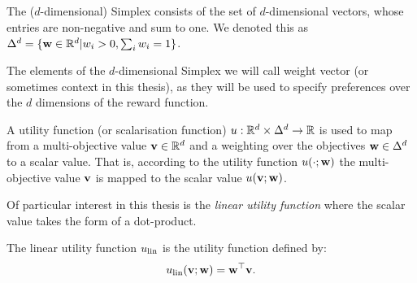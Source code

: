     \begin{defn}
        \label{def:simplex}
        \label{def:weight}
        \label{def:context}
        The \textnormal{($d$-dimensional) Simplex} consists of the set of $d$-dimensional vectors, whose entries are non-negative and sum to one. We denoted this as $\Delta^d = \{\mathbf{w}\in\mathbb{R}^d|w_i > 0, \sum_i w_i = 1\}$.

        The elements of the $d$-dimensional Simplex we will call \textnormal{weight vector} (or sometimes \textnormal{context} in this thesis), as they will be used to specify preferences over the $d$ dimensions of the reward function.
    \end{defn}

    \begin{defn}
        \label{def:utility_fn}
        \label{def:scalarisation_fn}
        A \textnormal{utility function} (or \textnormal{scalarisation function}) $u:\mathbb{R}^d\times\Delta^d \rightarrow \mathbb{R}$ is used to map from a multi-objective value $\mathbf{v}\in\mathbb{R}^d$ and a weighting over the objectives $\mathbf{w}\in\Delta^d$ to a scalar value. That is, according to the utility function $u(\cdot;\mathbf{w})$ the multi-objective value $\mathbf{v}$ is mapped to the scalar value $u(\mathbf{v};\mathbf{w})$.
    \end{defn}



    Of particular interest in this thesis is the \textit{linear utility function} where the scalar value takes the form of a dot-product.
    
    \begin{defn}
        \label{def:linear_utility_fn}
        \label{def:linear_scalarisation_fn}
        The \textnormal{linear utility function} $u_{\textnormal{lin}}$ is the utility function defined by:
        \begin{align}
            u_{\textnormal{lin}}(\mathbf{v};\mathbf{w}) = \mathbf{w}^\top \mathbf{v}.
        \end{align}
    \end{defn}

